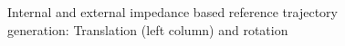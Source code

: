 \documentclass[a4paper,twoside, openright,12pt]{report}
\begin{document}
{%
%


%


\begin{figure}[h]

\label{FIG:CaViSim}
\caption[Simulation results: Internal and external impedance based reference trajectory generation]{Internal and external impedance based reference trajectory generation: Translation (left column) and rotation}
\end{figure}







}
\end{document}
